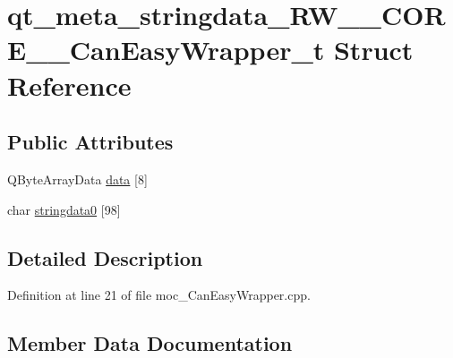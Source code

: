 \hypertarget{structqt__meta__stringdata___r_w_____c_o_r_e_____can_easy_wrapper__t}{}\section{qt\+\_\+meta\+\_\+stringdata\+\_\+\+R\+W\+\_\+\+\_\+\+C\+O\+R\+E\+\_\+\+\_\+\+Can\+Easy\+Wrapper\+\_\+t Struct Reference}
\label{structqt__meta__stringdata___r_w_____c_o_r_e_____can_easy_wrapper__t}
\subsection*{Public Attributes}
\begin{DoxyCompactItemize}
\item 
Q\+Byte\+Array\+Data \hyperlink{structqt__meta__stringdata___r_w_____c_o_r_e_____can_easy_wrapper__t_af8fd7f56e7ad14898aab60bc0f0c60d0}{data} \mbox{[}8\mbox{]}
\item 
char \hyperlink{structqt__meta__stringdata___r_w_____c_o_r_e_____can_easy_wrapper__t_afb65167009a1a69e0769fcae6e2b53f7}{stringdata0} \mbox{[}98\mbox{]}
\end{DoxyCompactItemize}


\subsection{Detailed Description}


Definition at line 21 of file moc\+\_\+\+Can\+Easy\+Wrapper.\+cpp.



\subsection{Member Data Documentation}
\hypertarget{structqt__meta__stringdata___r_w_____c_o_r_e_____can_easy_wrapper__t_af8fd7f56e7ad14898aab60bc0f0c60d0}{}\label{structqt__meta__stringdata___r_w_____c_o_r_e_____can_easy_wrapper__t_af8fd7f56e7ad14898aab60bc0f0c60d0} 

